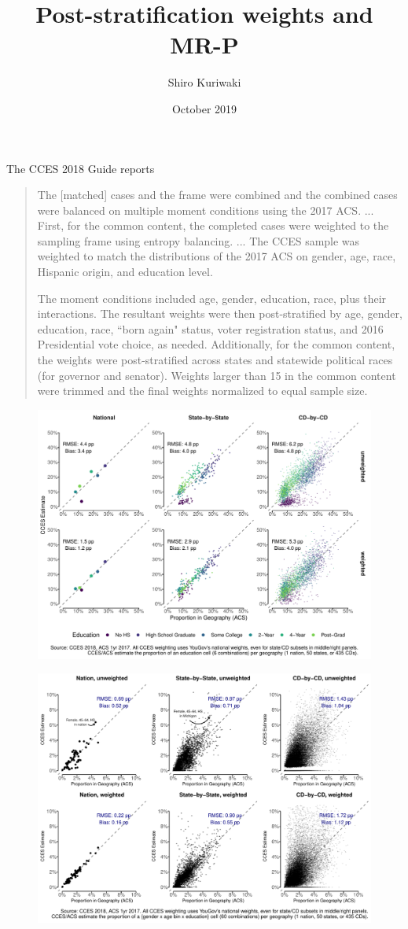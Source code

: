 \documentclass[11pt]{article}
\title{\large\textbf{Post-stratification weights and MR-P}}
\author{\normalsize  Shiro Kuriwaki}
\date{\normalsize October 2019}
\begin{document}
\maketitle

\onehalfspacing


The CCES 2018 Guide  reports
\begin{quote}
The [matched] cases and the frame were combined and the combined cases were balanced on multiple moment conditions using the 2017 ACS.  ... First, for the common content, the completed cases were weighted to the sampling frame using entropy balancing. ... The CCES sample was weighted to match the distributions of the 2017 ACS on gender, age, race, Hispanic origin, and education level. 

The moment conditions included age, gender, education, race, plus their interactions. The resultant weights were then post-stratified by age, gender, education, race, ``born again" status, voter registration status, and 2016 Presidential vote choice, as needed. Additionally, for the common content, the weights were post-stratified across states and statewide political races (for governor and senator). Weights larger than 15 in the common content were trimmed and the final weights normalized to equal sample size. 
\end{quote}

\begin{figure}[tbph]
\centering
\includegraphics[width = \textwidth]{figures/educfrac-comparisons.pdf}
\end{figure}

\begin{figure}
\centering
\includegraphics[width = \textwidth]{figures/cellfrac-comparisons.pdf}
\end{figure}
\end{document}

